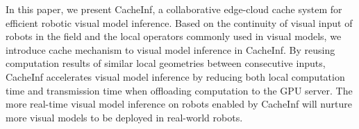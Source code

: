 In this paper, we present CacheInf, a collaborative edge-cloud cache system for efficient robotic visual model inference.
Based on the continuity of visual input of robots in the field and the local operators commonly used in visual models, we introduce cache mechanism to visual model inference in CacheInf.
By reusing computation results of similar local geometries between consecutive inputs, CacheInf accelerates visual model inference by reducing both local computation time and transmission time when offloading computation to the GPU server.
The more real-time visual model inference on robots enabled by CacheInf will nurture more visual models to be deployed in real-world robots.